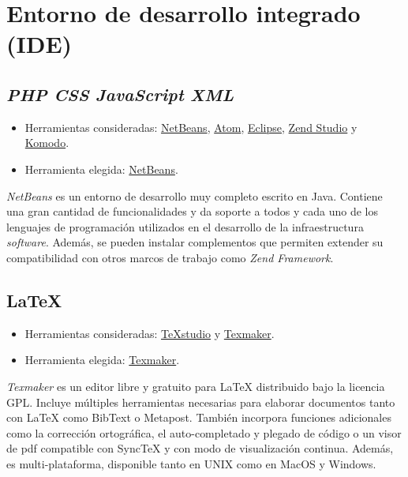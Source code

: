 \section{Entorno de desarrollo integrado (IDE)}

\subsection{\emph{PHP} \textbar{} \emph{CSS} \textbar{} \emph{JavaScript} \textbar{} \emph{XML}}

\begin{itemize}
\tightlist
\item
  Herramientas consideradas: \href{https://netbeans.org/}{NetBeans},
  \href{https://atom.io/}{Atom}, \href{https://eclipse.org/}{Eclipse},
  \href{https://www.zend.com/products/zend-studio}{Zend Studio} y
  \href{https://www.activestate.com/products/komodo-ide/}{Komodo}.
\item
  Herramienta elegida: \href{https://netbeans.org/}{NetBeans}.
\end{itemize}

\emph{NetBeans} es un entorno de desarrollo muy completo escrito en Java.
Contiene una gran cantidad de funcionalidades y da soporte a todos y
cada uno de los lenguajes de programación utilizados en el desarrollo de
la infraestructura \emph{software}. Además, se pueden instalar
complementos que permiten extender su compatibilidad con otros marcos de
trabajo como \emph{Zend Framework}.

\subsection{LaTeX}

\begin{itemize}
\tightlist
\item
  Herramientas consideradas:
  \href{https://www.texstudio.org/}{TeXstudio} y
  \href{http://www.xm1math.net/texmaker/}{Texmaker}.
\item
  Herramienta elegida:
  \href{http://www.xm1math.net/texmaker/}{Texmaker}.
\end{itemize}

\emph{Texmaker} es un editor libre y gratuito para LaTeX distribuido
bajo la licencia GPL. Incluye múltiples herramientas necesarias para
elaborar documentos tanto con LaTeX como BibText o Metapost. También
incorpora funciones adicionales como la corrección ortográfica, el
auto-completado y plegado de código o un visor de pdf compatible con
SyncTeX y con modo de visualización continua. Además, es
multi-plataforma, disponible tanto en UNIX como en MacOS y Windows.

